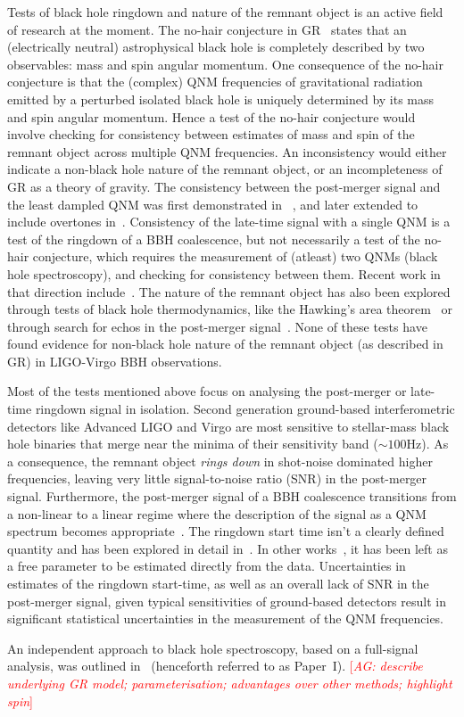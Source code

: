\documentclass[twocolumn,prd,superscriptaddress,amsfonts,amssymb,amsmath,preprintnumbers]{revtex4-1}
\newcommand{\paperone}{Paper~I\xspace}
\newcommand{\abhi}[1]{\textcolor{red}{[\textit{AG: #1}]}}
\begin{document}
\par
Tests of black hole ringdown and nature of the remnant object is an active field of research at the moment. The no-hair conjecture in GR~\citep{} states that an (electrically neutral) astrophysical black hole is completely described by two observables: mass and spin angular momentum. One consequence of the no-hair conjecture is that the (complex) QNM frequencies of gravitational radiation emitted by a perturbed isolated black hole is uniquely determined by its mass and spin angular momentum. Hence a test of the no-hair conjecture would involve checking for consistency between estimates of mass and spin of the remnant object across multiple QNM frequencies. An inconsistency would either indicate a non-black hole nature of the remnant object, or an incompleteness of GR as a theory of gravity. The consistency between the post-merger signal and the least dampled QNM was first demonstrated in ~\citep{GW150914TGR}, and later extended to include overtones in~\citep{isietal}. Consistency of the late-time signal with a single QNM is a test of the ringdown of a BBH coalescence, but not necessarily a test of the no-hair conjecture, which requires the measurement of (atleast) two QNMs (black hole spectroscopy), and checking for consistency between them. Recent work in that direction include~\citep{carulloetalpapers,bertipapers}. The nature of the remnant object has also been explored through tests of black hole thermodynamics, like the Hawking's area theorem~\citep{Miriametal} or through search for echos in the post-merger signal~\citep{nielsen,abedi,kawa}. None of these tests have found evidence for non-black hole nature of the remnant object (as described in GR) in LIGO-Virgo BBH observations.
\par
Most of the tests mentioned above focus on analysing the post-merger or late-time ringdown signal in isolation. Second generation ground-based interferometric detectors like Advanced LIGO and Virgo are most sensitive to stellar-mass black hole binaries that merge near the minima of their sensitivity band ($\sim 100$Hz). As a consequence, the remnant object \textit{rings down} in shot-noise dominated higher frequencies, leaving very little signal-to-noise ratio (SNR) in the post-merger signal. Furthermore, the post-merger signal of a BBH coalescence transitions from a non-linear to a linear regime where the description of the signal as a QNM spectrum becomes appropriate~\citep{}. The ringdown start time isn't a clearly defined quantity and has been explored in detail in~\citep{bhagwatetal}. In other works~\citep{carulloetal}, it has been left as a free parameter to be estimated directly from the data. Uncertainties in estimates of the ringdown start-time, as well as an overall lack of SNR in the post-merger signal, given typical sensitivities of ground-based detectors result in significant statistical uncertainties in the measurement of the QNM frequencies.
\par
An independent approach to black hole spectroscopy, based on a full-signal analysis, was outlined in~\citep{britopaper1} (henceforth referred to as \paperone). \abhi{describe underlying GR model; parameterisation; advantages over other methods; highlight spin} 
\end{document}
